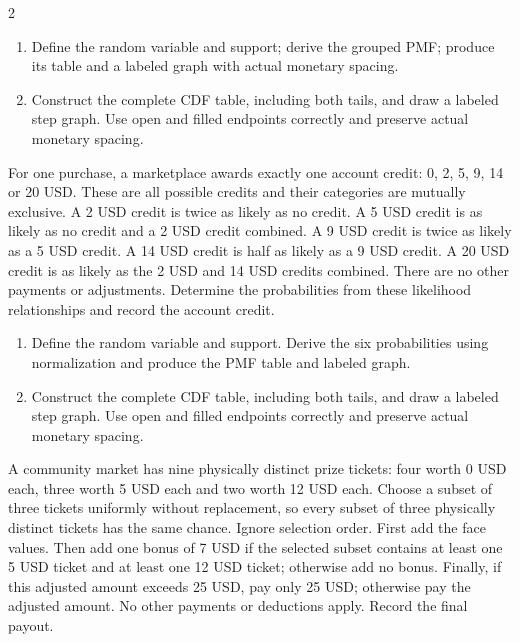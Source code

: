 \begin{multicols*}{2}
\begin{enumerate}[label=(\alph*)]
\item Define the random variable and support; derive the grouped PMF; produce its table and a labeled graph with actual monetary spacing. 
\item Construct the complete CDF table, including both tails, and draw a labeled step graph. Use open and filled endpoints correctly and preserve actual monetary spacing. 
\end{enumerate}

For one purchase, a marketplace awards exactly one account credit: 0, 2, 5, 9, 14 or 20 USD. These are all possible credits and their categories are mutually exclusive. A 2 USD credit is twice as likely as no credit. A 5 USD credit is as likely as no credit and a 2 USD credit combined. A 9 USD credit is twice as likely as a 5 USD credit. A 14 USD credit is half as likely as a 9 USD credit. A 20 USD credit is as likely as the 2 USD and 14 USD credits combined. There are no other payments or adjustments. Determine the probabilities from these likelihood relationships and record the account credit.

\begin{enumerate}[label=(\alph*)]
\item Define the random variable and support. Derive the six probabilities using normalization and produce the PMF table and labeled graph. 
\item Construct the complete CDF table, including both tails, and draw a labeled step graph. Use open and filled endpoints correctly and preserve actual monetary spacing. 
\end{enumerate}

\columnbreak
{}
A community market has nine physically distinct prize tickets: four worth 0 USD each, three worth 5 USD each and two worth 12 USD each. Choose a subset of three tickets uniformly without replacement, so every subset of three physically distinct tickets has the same chance. Ignore selection order. First add the face values. Then add one bonus of 7 USD if the selected subset contains at least one 5 USD ticket and at least one 12 USD ticket; otherwise add no bonus. Finally, if this adjusted amount exceeds 25 USD, pay only 25 USD; otherwise pay the adjusted amount. No other payments or deductions apply. Record the final payout.


\end{multicols*}
